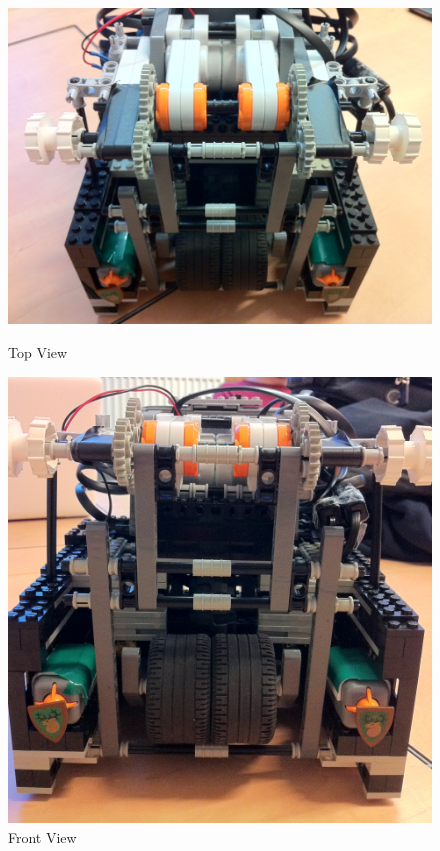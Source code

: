 \documentclass[12pt, a4paper, titlepage]{article}
\begin{document}
\begin{figure}[h]
\begin{minipage}[b]{0.5\linewidth}
\centering
\includegraphics[scale=0.2]{images/robot/topview.jpg}
\caption{Top View}
\label{fig:topview}
\end{minipage}
\hspace{0.5cm}
\begin{minipage}[b]{0.5\linewidth}
\centering
\includegraphics[scale=0.2]{images/robot/frontview.jpg}
\caption{Front View}
\label{fig:frontview}
\end{minipage}
\end{figure}
\end{document}
